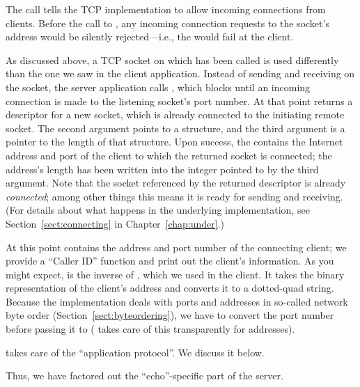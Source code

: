 \begin{topcode}
\begin{bottomcode}

The  call tells the TCP implementation to allow incoming
connections from clients.  Before the call to ,
any incoming connection requests to the socket's address would be silently
rejected---i.e., the  would fail at the client.

\end{bottomcode}


\begin{bottomcode}


As discussed above, a TCP socket on which  has
been called is used differently than the one we saw in the client
application.  Instead of sending and receiving on the socket, the
server application calls , which blocks until an
incoming connection is made to the listening socket's port number.
At that point  returns a descriptor for a new
socket, which is already connected to the initiating remote socket.  The second
argument points to a  structure, and the third
argument is a pointer to the length of that structure.  Upon success,
the  contains the Internet address and port of
the client to which the returned socket is connected; the address's
length has been written into the integer pointed to by the third
argument.  Note that the socket referenced by the returned descriptor
is already \emph{connected}; among other things this means it is ready
for sending and receiving.  (For details about what happens in the
underlying implementation, see Section~\ref{sect:connecting} in
Chapter~\ref{chap:under}.)


At this point
 contains the address and port number
of the connecting client; we
provide a ``Caller ID'' function and print out the client's  information.
As you might expect,  is the inverse of
, which we
used in the client.  It takes the binary representation of the
client's address and converts it to a dotted-quad string.  Because the
implementation deals with ports and addresses in so-called network
byte order (Section~\ref{sect:byteordering}), we have to convert the
port number before passing it to  (
takes care of this transparently for addresses).


 takes care of the ``application
protocol''.  We discuss it below.

 Thus, we have factored out the
``echo''-specific part of the server.

\end{bottomcode}

\end{topcode}

